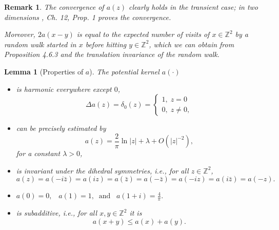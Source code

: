 \documentclass[11pt]{article}
\numberwithin{equation}{section}
\def\mydot{\boldsymbol{\cdot}}
\newtheorem{lemma}[theorem]{Lemma}
\newtheorem*{remark}{Remark}
\begin{document}
\begin{remark}
  The convergence of $a(z)$ clearly holds  
  in the transient case; in two dimensions 
  \cite{spitzer}, Ch. 12, Prop. 1 proves the convergence.

  Moreover, \hbox{$2a(x - y)$} is equal to the expected number 
  of visits of $x \in \mathbb{Z}^2$ by a random 
  walk started in $x$ before hitting 
  $y \in \mathbb{Z}^2$, which we can obtain from 
  \cite{lawler} Proposition 4.6.3 and the translation invariance of the random walk. 
\end{remark}

\begin{lemma}[Properties of $a$]
  \label{L: properties of a}
  The potential kernel $a(\mydot)$ 
  \begin{itemize}
    \item[(a)] is harmonic everywhere except $0$, 
      \begin{equation} \nonumber
        \Delta a (z) 
        = \delta_0(z) =
        \begin{cases}
          1,\; z = 0\\
          0,\; z \neq 0,
        \end{cases} 
      \end{equation}

    \item[(b)] can be precisely estimated by
      \begin{equation}\nonumber
        a(z) = \frac{2}{\pi} \ln |z| + \lambda + O(|z|^{-2}), 
      \end{equation} 
      for a constant $\lambda > 0$,

    \item[(c)] is invariant under the dihedral symmetries, 
      i.e., for all $z \in \mathbb{Z}^2$,  
      \begin{equation}
      \nonumber
      a(z) = a(-i\bar{z}) = 
      a(i z) =a(\bar{z}) =a(-\bar{z})
      =a(-i z)=a(i \bar{z})=a(-z).
      \end{equation}

    \item[(d)] 
        $a(0) = 0, \;\;\; a(1) = 1, \;\;\text{and} \;\;\; a(1+i) = \frac{4}{\pi}.$

    \item[(e)] is subadditive, i.e., for all $x, y \in \mathbb{Z}^2$ it is
      \begin{equation}\nonumber
        a(x+y) \leq a(x) + a(y).
      \end{equation}  
  \end{itemize}
\end{lemma}
 
\end{document}
